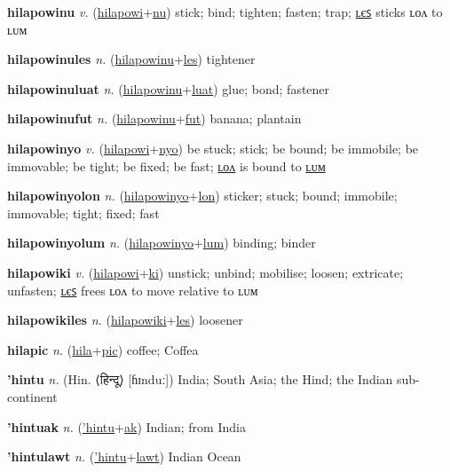 \textbf{\hypertarget{hilapowinu}{hilapowinu}} \textit{v.} (\hyperlink{hilapowi}{hilapowi}+\allowbreak \hyperlink{nu}{nu})
stick; bind; tighten; fasten; trap; \hyperlink{hilapowinules}{ʟєꜱ} sticks ʟᴏᴧ to ʟᴜᴍ

\textbf{\hypertarget{hilapowinules}{hilapowinules}} \textit{n.} (\hyperlink{hilapowinu}{hilapowinu}+\allowbreak \hyperlink{les}{les})
tightener

\textbf{\hypertarget{hilapowinuluat}{hilapowinuluat}} \textit{n.} (\hyperlink{hilapowinu}{hilapowinu}+\allowbreak \hyperlink{luat}{luat})
glue; bond; fastener

\textbf{\hypertarget{hilapowinufut}{hilapowinufut}} \textit{n.} (\hyperlink{hilapowinu}{hilapowinu}+\allowbreak \hyperlink{fut}{fut})
banana; plantain

\textbf{\hypertarget{hilapowinyo}{hilapowinyo}} \textit{v.} (\hyperlink{hilapowi}{hilapowi}+\allowbreak \hyperlink{nyo}{nyo})
be stuck; stick; be bound; be immobile; be immovable; be tight; be fixed; be fast; \hyperlink{hilapowinyolon}{ʟᴏᴧ} is bound to \hyperlink{hilapowinyolum}{ʟᴜᴍ}

\textbf{\hypertarget{hilapowinyolon}{hilapowinyolon}} \textit{n.} (\hyperlink{hilapowinyo}{hilapowinyo}+\allowbreak \hyperlink{lon}{lon})
sticker; stuck; bound; immobile; immovable; tight; fixed; fast

\textbf{\hypertarget{hilapowinyolum}{hilapowinyolum}} \textit{n.} (\hyperlink{hilapowinyo}{hilapowinyo}+\allowbreak \hyperlink{lum}{lum})
binding; binder

\textbf{\hypertarget{hilapowiki}{hilapowiki}} \textit{v.} (\hyperlink{hilapowi}{hilapowi}+\allowbreak \hyperlink{ki}{ki})
unstick; unbind; mobilise; loosen; extricate; unfasten; \hyperlink{hilapowikiles}{ʟєꜱ} frees ʟᴏᴧ to move relative to ʟᴜᴍ

\textbf{\hypertarget{hilapowikiles}{hilapowikiles}} \textit{n.} (\hyperlink{hilapowiki}{hilapowiki}+\allowbreak \hyperlink{les}{les})
loosener

\textbf{\hypertarget{hilapic}{hilapic}} \textit{n.} (\hyperlink{hila}{hila}+\allowbreak \hyperlink{pic}{pic})
coffee; Coffea

\textbf{\hypertarget{'hintu}{'hintu}} \textit{n.} (Hin. ⟨{\devanagari{}हिन्दू}⟩ [ɦɪnduː])
India; South Asia; the Hind; the Indian sub-continent

\textbf{\hypertarget{'hintuak}{'hintuak}} \textit{n.} (\hyperlink{'hintu}{'hintu}+\allowbreak \hyperlink{ak}{ak})
Indian; from India

\textbf{\hypertarget{'hintulawt}{'hintulawt}} \textit{n.} (\hyperlink{'hintu}{'hintu}+\allowbreak \hyperlink{lawt}{lawt})
Indian Ocean


